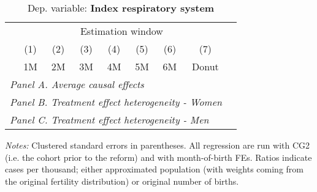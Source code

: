  \begin{table}[H] \begin{threeparttable} \centering \caption{Dep. variable: \textbf{Index respiratory system}} {\def\sym#1{\ifmmode^{#1}\else\(^{#1}\)\fi} \begin{tabular}{l*{8}{c}} \toprule & \multicolumn{7}{c}{Estimation window} \\ \cmidrule(lr){2-8}
            &\multicolumn{1}{c}{(1)}&\multicolumn{1}{c}{(2)}&\multicolumn{1}{c}{(3)}&\multicolumn{1}{c}{(4)}&\multicolumn{1}{c}{(5)}&\multicolumn{1}{c}{(6)}&\multicolumn{1}{c}{(7)}\\
            &\multicolumn{1}{c}{1M}&\multicolumn{1}{c}{2M}&\multicolumn{1}{c}{3M}&\multicolumn{1}{c}{4M}&\multicolumn{1}{c}{5M}&\multicolumn{1}{c}{6M}&\multicolumn{1}{c}{Donut}\\
\midrule
 \multicolumn{8}{l}{\emph{Panel A. Average causal effects}} \\       \midrule\multicolumn{8}{l}{\emph{Panel B. Treatment effect heterogeneity - Women}} \\       \midrule\multicolumn{8}{l}{\emph{Panel C. Treatment effect heterogeneity - Men}} \\       
\bottomrule \end{tabular} } \begin{tablenotes} \item \scriptsize \emph{Notes:} Clustered standard errors in parentheses. All regression are run with CG2 (i.e. the cohort prior to the reform) and with month-of-birth FEs. Ratios indicate cases per thousand; either approximated population (with weights coming from the original fertility distribution) or original number of births. \end{tablenotes} \end{threeparttable} \end{table} 
